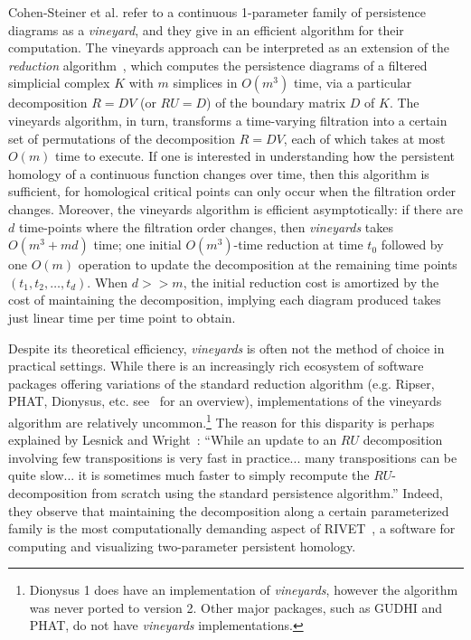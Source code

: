 \documentclass[sn-mathphys]{sn-jnl}
\begin{document}
Cohen-Steiner et al. refer to a continuous 1-parameter family of persistence diagrams as a \emph{vineyard}, and they give in \cite{cohen2006vines} an efficient algorithm for their computation. 
The vineyards approach can be interpreted as an extension of the \emph{reduction} algorithm~\cite{zomorodian2005computing}, which computes the persistence diagrams of a filtered simplicial complex $K$ with $m$ simplices in $O(m^3)$ time, via a particular decomposition $R = D V$ (or $RU = D$) of the boundary matrix $D$ of $K$.
The vineyards algorithm, in turn,  transforms a time-varying filtration into a certain set of permutations of the decomposition $R = DV$, each of which takes at most $O(m)$ time to execute. If one is interested in understanding how the persistent homology of a continuous function changes over time, then this algorithm is sufficient, for homological critical points can only occur when the filtration order changes. 
Moreover, the vineyards algorithm is efficient asymptotically: if there are $d$ time-points where the filtration order changes, then  \emph{vineyards}  takes $O(m^3 + md)$ time; one initial $O(m^3)$-time reduction at time $t_0$ followed by one $O(m)$ operation to update the decomposition at the remaining time points $(t_1, t_2, \dots, t_d)$. When $d >> m$, the initial reduction cost is amortized by the cost of maintaining the decomposition, implying each diagram produced takes just linear time per time point to obtain. 

Despite its theoretical efficiency, \emph{vineyards} is often not the method of choice in practical settings. 
While there is an increasingly rich ecosystem of software packages offering variations of the standard reduction algorithm (e.g. Ripser, PHAT, Dionysus, etc. see~\cite{otter2017roadmap} for an overview), implementations of the vineyards algorithm are relatively uncommon.\footnote{Dionysus 1 does have an implementation of \emph{vineyards}, however the algorithm was never ported to version 2. Other major packages, such as GUDHI and PHAT, do not have \emph{vineyards} implementations.} 
The reason for this disparity is perhaps explained by Lesnick and Wright~\cite{lesnick2015interactive}: ``While an update to an $RU$ decomposition involving few transpositions is very fast in practice... many transpositions can be quite slow... it is sometimes much faster to simply recompute the $RU$-decomposition from scratch using the standard persistence algorithm.'' Indeed, they observe that maintaining the decomposition along a certain parameterized family is the most computationally demanding aspect of RIVET~\cite{rivet}, a software for computing and visualizing	 two-parameter persistent homology.
\end{document}
